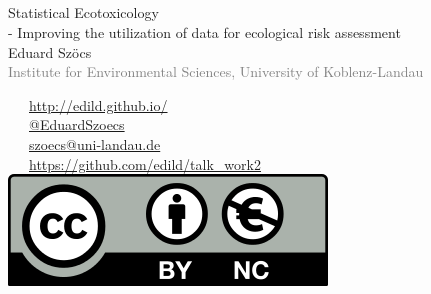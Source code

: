 \documentclass[12pt, t, draft]{beamer}
\begin{document}
\subsection{}



\begin{frame}[plain]
\frametitle{}
\vspace{1em}
\begin{centering}
\Large \textcolor{title}{Statistical Ecotoxicology \\ - Improving the utilization of data for ecological risk assessment} \\[1em]
Eduard Szöcs \\[0.3em]
\tiny \textcolor{gray}{Institute for Environmental Sciences, University of Koblenz-Landau} \\[3em]
\end{centering}
\normalsize
\textcolor{hilight}{\faLaptop}~~~\href{http://edild.github.io/}{http://edild.github.io/ }\\[.5em]
\textcolor{hilight}{\faTwitter}~~~\href{http://twitter.com/EduardSzoecs}{@EduardSzoecs} 	\\[0.5em]
\textcolor{hilight}{\faEnvelope}~~~\href{mailto:szoecs@uni-landau.de}{szoecs@uni-landau.de} \\[.5em]
\textcolor{hilight}{\faGift}~~~\href{https://github.com/edild/talk_work2}{https://github.com/edild/talk\_work2}\\[0.5em]
\hfill \includegraphics[width =.3\textwidth]{fig/Cc-by-nc_euro_icon.png} 
\end{frame}
\end{document}
